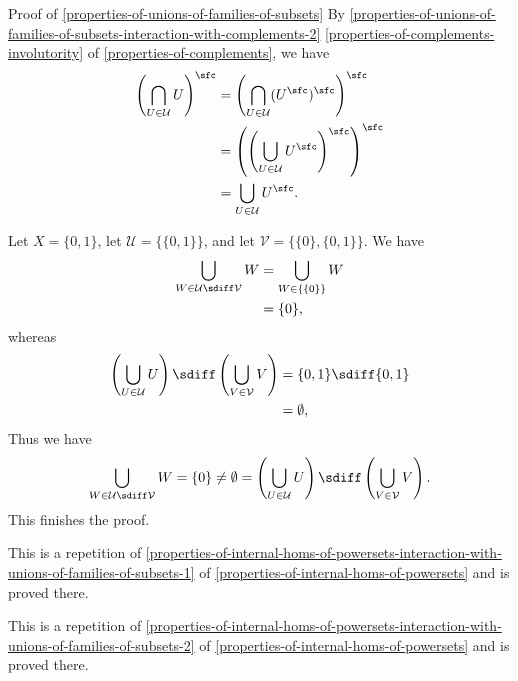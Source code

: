 \begin{Proof}{Proof of \cref{properties-of-unions-of-families-of-subsets}}
    By \cref{properties-of-unions-of-families-of-subsets-interaction-with-complements-2} \cref{properties-of-complements-involutority} of \cref{properties-of-complements}, we have
    \begin{align*}
        \left( \bigcap_{U \in \mathcal U} U \right)^{\sfc} &= \left( \bigcap_{U \in \mathcal U} (U^{\sfc})^{\sfc} \right)^{\sfc}\\
        &= \left(\left( \bigcup_{U \in \mathcal U} U^{\sfc} \right)^{\sfc}\right)^{\sfc}\\
        &= \bigcup_{U \in \mathcal U} U^{\sfc}.
    \end{align*}

    Let $X=\{0,1\}$, let $\mathcal{U}=\{\{0,1\}\}$, and let $\mathcal{V}=\{\{0\},\{0,1\}\}$. We have
    \begin{align*}
        \bigcup_{W\in\mathcal{U}\sdiff\mathcal{V}}W &= \bigcup_{W\in\{\{0\}\}}W\\
                                                    &= \{0\},
    \end{align*}
    whereas
    \begin{align*}
        \left(\bigcup_{U\in\mathcal{U}}U\right)\sdiff\left(\bigcup_{V\in\mathcal{V}}V\right) &= \{0,1\}\sdiff\{0,1\}\\
                                                                                             &= \emptyset,
    \end{align*}
    Thus we have
    \[
        \bigcup_{W\in\mathcal{U}\sdiff\mathcal{V}}W%
        =%
        \{0\}%
        \neq%
        \emptyset%
        =%
        \left(\bigcup_{U\in\mathcal{U}}U\right)\sdiff\left(\bigcup_{V\in\mathcal{V}}V\right).%
    \]%
    This finishes the proof.

    This is a repetition of \cref{properties-of-internal-homs-of-powersets-interaction-with-unions-of-families-of-subsets-1} of \cref{properties-of-internal-homs-of-powersets} and is proved there.

    This is a repetition of \cref{properties-of-internal-homs-of-powersets-interaction-with-unions-of-families-of-subsets-2} of \cref{properties-of-internal-homs-of-powersets} and is proved there.


\end{Proof}
